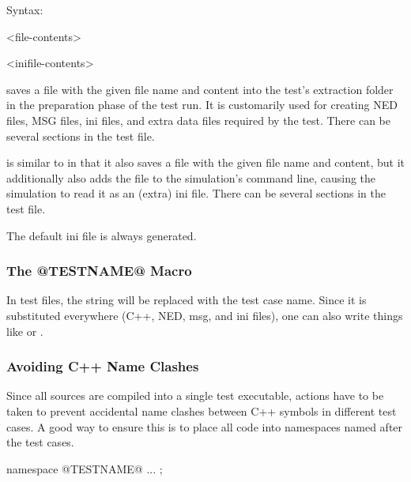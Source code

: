 Syntax:

\begin{filelisting}
<file-contents>
\end{filelisting}

\begin{filelisting}
<inifile-contents>
\end{filelisting}

 saves a file with the given file name and content into the test's
extraction folder in the preparation phase of the test run. It is customarily
used for creating NED files, MSG files, ini files, and extra data files
required by the test. There can be several  sections in the test file.

 is similar to  in that it also saves a file with the
given file name and content, but it additionally also adds the file to the simulation's
command line, causing the simulation to read it as an (extra) ini file.
There can be several  sections in the test file.

The default ini file is always generated.


\subsubsection{The @TESTNAME@ Macro}
\label{sec:testing:opptest:testname-macro}

In test files, the string  will be replaced with the test
case name. Since it is substituted everywhere (C++, NED, msg, and ini
files), one can also write things like  or
.

\subsubsection{Avoiding C++ Name Clashes}
\label{sec:testing:opptest:avoiding-cpp-name-clashes}

Since all sources are compiled into a single test executable, actions have
to be taken to prevent accidental name clashes between C++ symbols in
different test cases. A good way to ensure this is to place all code into
namespaces named after the test cases.

\begin{filelisting}
namespace @TESTNAME@ {
   ...
};
\end{filelisting}

